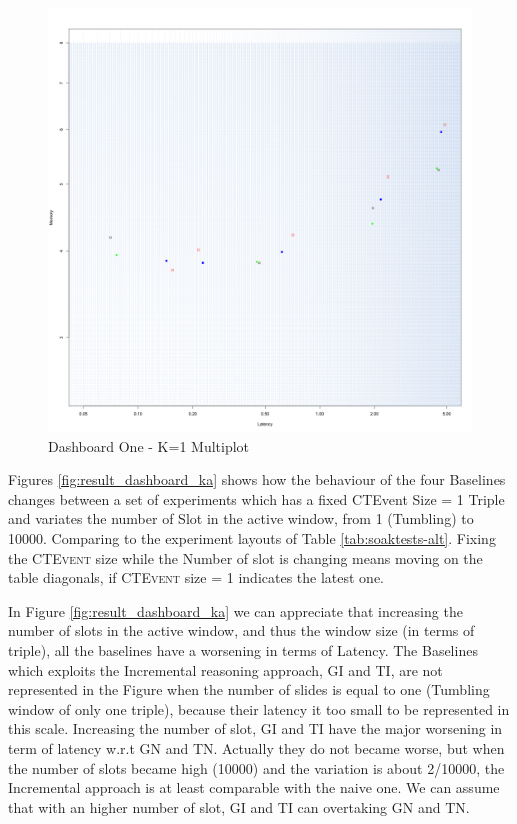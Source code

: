 \begin{figure}[htb]
	\centering
	\includegraphics[width=0.90\linewidth]{images/dashboard-1}	
	\caption{Dashboard One - K=1 Multiplot} 
	\label{fig:result_dashboard_kb}
\end{figure}

Figures \ref{fig:result_dashboard_ka} shows how the behaviour of the four Baselines changes between a set of experiments which has a fixed CTEvent Size = 1 Triple and variates the number of Slot in the active window, from 1 (Tumbling) to 10000. Comparing to the experiment layouts of Table \ref{tab:soaktests-alt}. Fixing the \textsc{CTEvent} size while the Number of slot is changing means moving on the table diagonals, if \textsc{CTEvent} size = 1 indicates the latest one.

In Figure \ref{fig:result_dashboard_ka} we can appreciate that increasing the number of slots in the active window, and thus the window size (in terms of triple), all the baselines have a worsening in terms of Latency. The Baselines which exploits the Incremental reasoning approach, GI and TI, are not represented in the Figure when the number of slides is equal to one (Tumbling window of only one triple), because their latency it too small to be represented in this scale. Increasing the number of slot, GI and TI have the major worsening in term of latency w.r.t GN and TN. Actually they do not became worse, but when the number of slots became high (10000) and the variation is about 2/10000,  the Incremental approach is at least comparable with the naive one. We can assume that with an higher number of slot, GI and TI can overtaking  GN and TN.

